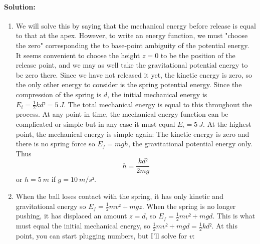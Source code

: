 \paragraph{Solution:}
\begin{enumerate} 
\item We will solve this by saying that the mechanical energy before release is equal to that at the apex. However, to write an energy function, we must "choose the zero" corresponding the to base-point ambiguity of the potential energy. It seems convenient to choose the height $z=0$ to be the position of the release point, and we may as well take the gravitational potential energy to be zero there. Since we have not released it yet, the kinetic energy is zero, so the only other energy to consider is the spring potential energy. Since the compression of the spring is $d$, the initial mechanical energy is $E_i = \frac12 k d²= 5\ J$. The total mechanical energy is equal to this throughout the process. At any point in time, the mechanical energy function can be complicated or simple but in any case it must equal $E_i=5\ J$. At the highest point, the mechanical energy is simple again: The kinetic energy is zero and there is no spring force so $E_f = mgh$, the gravitational potential energy only. Thus 
$$
h = \frac{k d²}{2mg} 
$$
or $h= 5\ m$ if $g=10\ m/s²$. 
\item When the ball loses contact with the spring, it has only kinetic and gravitational energy so $E_f = \frac12 mv² + mgz$. When the spring is no longer pushing, it has displaced an amount $z=d$, so $E_f = \frac12 mv² + mgd$. This is what must equal the initial mechanical energy, so $\frac12 mv² + mgd = \frac12 k d²$. At this point, you can start plugging numbers, but I'll solve for $v$:

\end{enumerate}
